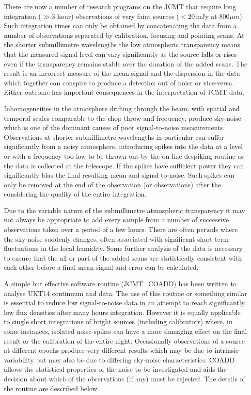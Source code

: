\documentclass{article}
\begin{document}
There are now a number of research programs on the JCMT that require long
integration ($\gg 3$ hour) observations of very faint sources ($< 20$\,mJy at
800$\mu m$). Such integration times can only be obtained by
concatenating the data
from a number of observations separated by calibration, focusing and pointing
scans. At the shorter submillimetre wavelengths the low atmospheric
transparency means that the measured signal level can vary significantly as the
source falls or rises even if the transparency remains stable over the duration
of the added scans. The result is an incorrect measure of the mean signal and
the dispersion in the data which together can conspire to produce a detection
out of noise or vice-versa. Either outcome has important consequences in the
interpretation of JCMT data.

Inhomogeneities in the atmosphere drifting through the beam, with spatial and
temporal scales comparable to the chop throw and frequency, produce sky-noise
which is one of the dominant causes of poor signal-to-noise measurements.
Observations at shorter submillimetre wavelengths in particular can suffer
significantly from a noisy atmosphere, introducing spikes into the data at a
level or with a frequency too low to be thrown out  by the on-line despiking
routine as the data is
collected at the telescope. If the spikes have sufficient power they can
significantly bias the final resulting mean and signal-to-noise. Such spikes
can only be removed at the end of the observation (or observations) after
the considering the quality of the entire integration.

Due to the variable nature of the submillimetre atmospheric transparency it may
not always be appropriate to add every sample from a number of successive
observations taken over
a period of a few hours. There are often periods where the sky-noise suddenly
changes, often associated with significant short-term fluctuations in the local
humidity. Some further analysis of the data is necessary to ensure that the
all or part of the added scans are statistically consistent with each other
before a final mean signal and error can be calculated.



A simple but effective software routine (JCMT\_COADD) has been written to
analyse UKT14 continuum and data.
The use of this routine or something similar is essential to reduce
low signal-to-noise data in an attempt to reach significantly low flux
densities after many hours integration. However it is
equally applicable to single short integrations of bright sources (including
calibrators) where, in some instances,  isolated noise-spikes can have a
more damaging effect on the final result or the calibration of the
entire night.
Occasionally observations of a source at different epochs produce very
different results which may be due to intrinsic variability but may also
be due to differing sky-noise characteristics. COADD allows the statistical
properties of the noise to be investigated and aids the decision about
which of the observations (if any) must be rejected.
The details of the routine are described below.
\end{document}
